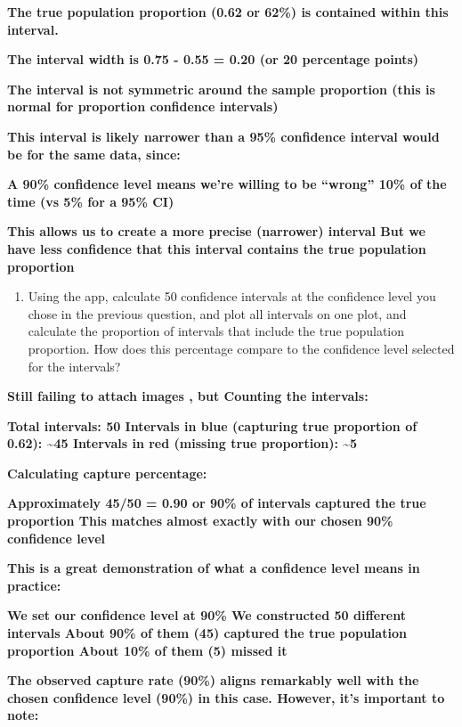\documentclass[
]{article}
\providecommand{\tightlist}{%
  \setlength{\itemsep}{0pt}\setlength{\parskip}{0pt}}
\begin{document}
\textbf{The true population proportion (0.62 or 62\%) is contained
within this interval.}

\textbf{The interval width is 0.75 - 0.55 = 0.20 (or 20 percentage
points)}

\textbf{The interval is not symmetric around the sample proportion (this
is normal for proportion confidence intervals)}

\textbf{This interval is likely narrower than a 95\% confidence interval
would be for the same data, since:}

\textbf{A 90\% confidence level means we're willing to be ``wrong'' 10\%
of the time (vs 5\% for a 95\% CI)}

\textbf{This allows us to create a more precise (narrower) interval But
we have less confidence that this interval contains the true population
proportion}

\begin{enumerate}
\def\labelenumi{\arabic{enumi}.}
\tightlist
\item
  Using the app, calculate 50 confidence intervals at the confidence
  level you chose in the previous question, and plot all intervals on
  one plot, and calculate the proportion of intervals that include the
  true population proportion. How does this percentage compare to the
  confidence level selected for the intervals?
\end{enumerate}

\textbf{Still failing to attach images , but Counting the intervals:}

\textbf{Total intervals: 50 Intervals in blue (capturing true proportion
of 0.62): \textasciitilde45 Intervals in red (missing true proportion):
\textasciitilde5}

\textbf{Calculating capture percentage:}

\textbf{Approximately 45/50 = 0.90 or 90\% of intervals captured the
true proportion This matches almost exactly with our chosen 90\%
confidence level}

\textbf{This is a great demonstration of what a confidence level means
in practice:}

\textbf{We set our confidence level at 90\% We constructed 50 different
intervals About 90\% of them (45) captured the true population
proportion About 10\% of them (5) missed it}

\textbf{The observed capture rate (90\%) aligns remarkably well with the
chosen confidence level (90\%) in this case. However, it's important to
note:}
\end{document}
